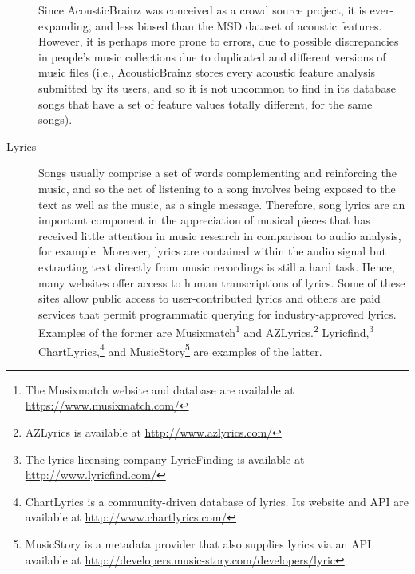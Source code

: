 \begin{description}
Since AcousticBrainz was conceived as a crowd source project, it is ever-expanding, and less biased than the MSD dataset of acoustic features. However, it is perhaps more prone to errors, due to possible discrepancies in people's music collections due to duplicated and different versions of music files (i.e., AcousticBrainz stores every acoustic feature analysis submitted by its users, and so it is not uncommon to find in its database songs that have a set of feature values totally different, for the same songs).


\item [Lyrics] Songs usually comprise a set of words complementing and reinforcing the music, and so the act of listening to a song involves being exposed to the text as well as the music, as a single message.   Therefore, song lyrics are an important component in the appreciation of musical pieces that has received little attention in music research in comparison to audio analysis, for example.
Moreover, lyrics are contained within the audio signal but extracting  text directly from music recordings is still a hard task. Hence, many websites offer access to human transcriptions of lyrics. Some of these sites allow public access to user-contributed lyrics and others are paid services that permit programmatic querying for industry-approved lyrics. 
Examples of the former are 
Musixmatch\footnote{The Musixmatch website and database are available at \url{https://www.musixmatch.com/}} and 
AZLyrics.\footnote{AZLyrics is available at \url{http://www.azlyrics.com/}} 
Lyricfind,\footnote{The lyrics licensing company LyricFinding is available at \url{http://www.lyricfind.com/}} 
ChartLyrics,\footnote{ChartLyrics is a community-driven database of lyrics. Its website and API are available at \url{http://www.chartlyrics.com/}} and 
MusicStory\footnote{MusicStory is a metadata provider that also supplies lyrics via an API available at \url{http://developers.music-story.com/developers/lyric}} are examples of the latter.


\end{description}
